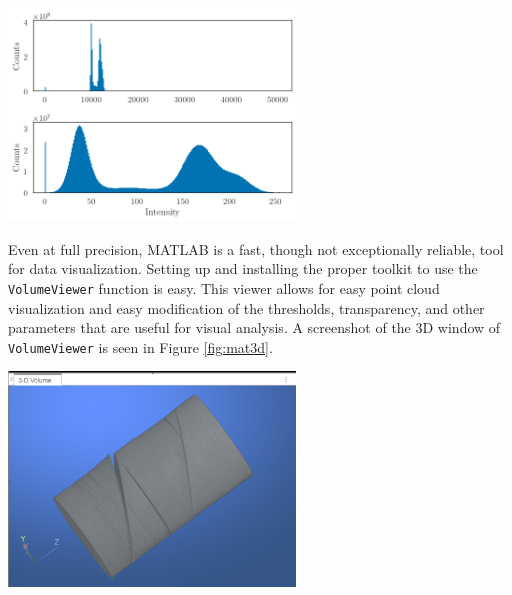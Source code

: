\documentclass[11pt, letterpaper, notitlepage]{article}
\newenvironment{Figure}
  {\par\medskip\noindent\minipage{\linewidth}}
  {\endminipage\par\medskip}
\begin{document}
\begin{multicols}{2}
\begin{Figure}
    \centering
    \includegraphics[width=3in]{images/hist-compare.png}
    \label{fig:comphist}
\end{Figure}


Even at full precision, MATLAB\cite{inc_matlab_2022} is a fast, though not exceptionally reliable, tool for data visualization. Setting up and installing the proper toolkit to use the \verb|VolumeViewer| function is easy. This viewer allows for easy point cloud visualization and easy modification of the thresholds, transparency, and other parameters that are useful for visual analysis. A screenshot of the 3D window of \verb|VolumeViewer| is seen in Figure \ref{fig:mat3d}.

\begin{Figure}
  \centering
  \includegraphics[width=3in]{images/MATLAB_VV_2D.png}
  \label{fig:mat3d}
\end{Figure}


\end{multicols}
\end{document}
